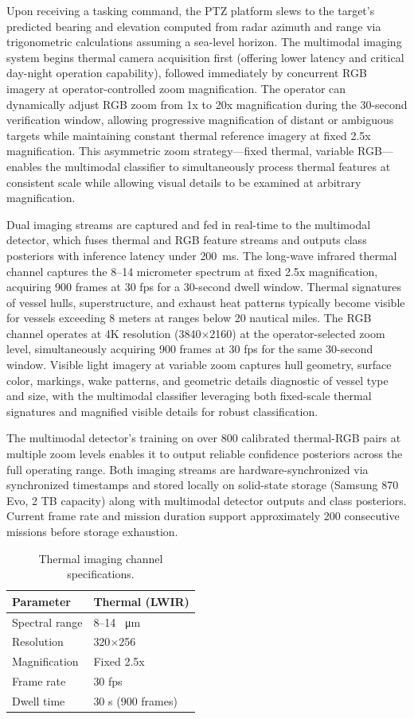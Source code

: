 \documentclass[conf]{asmeconf}
\begin{document}
Upon receiving a tasking command, the PTZ platform slews to the target's predicted bearing and elevation computed from radar azimuth and range via trigonometric calculations assuming a sea-level horizon. The multimodal imaging system begins thermal camera acquisition first (offering lower latency and critical day-night operation capability), followed immediately by concurrent RGB imagery at operator-controlled zoom magnification. The operator can dynamically adjust RGB zoom from 1x to 20x magnification during the 30-second verification window, allowing progressive magnification of distant or ambiguous targets while maintaining constant thermal reference imagery at fixed 2.5x magnification. This asymmetric zoom strategy—fixed thermal, variable RGB—enables the multimodal classifier to simultaneously process thermal features at consistent scale while allowing visual details to be examined at arbitrary magnification.

Dual imaging streams are captured and fed in real-time to the multimodal detector, which fuses thermal and RGB feature streams and outputs class posteriors with inference latency under \SI{200}{ms}. The long-wave infrared thermal channel captures the 8--14 micrometer spectrum at fixed 2.5x magnification, acquiring 900 frames at 30 fps for a 30-second dwell window. Thermal signatures of vessel hulls, superstructure, and exhaust heat patterns typically become visible for vessels exceeding 8 meters at ranges below 20 nautical miles. The RGB channel operates at 4K resolution (3840$\times$2160) at the operator-selected zoom level, simultaneously acquiring 900 frames at 30 fps for the same 30-second window. Visible light imagery at variable zoom captures hull geometry, surface color, markings, wake patterns, and geometric details diagnostic of vessel type and size, with the multimodal classifier leveraging both fixed-scale thermal signatures and magnified visible details for robust classification.

The multimodal detector's training on over 800 calibrated thermal-RGB pairs at multiple zoom levels enables it to output reliable confidence posteriors across the full operating range. Both imaging streams are hardware-synchronized via synchronized timestamps and stored locally on solid-state storage (Samsung 870 Evo, 2 TB capacity) along with multimodal detector outputs and class posteriors. Current frame rate and mission duration support approximately 200 consecutive missions before storage exhaustion.

\begin{table}[t]
\caption{Thermal imaging channel specifications.}
\label{tab:camera_thermal}
\centering
\small
\begin{tabular}{@{}ll@{}}
\toprule
Parameter & Thermal (LWIR) \\
\midrule
Spectral range & 8--14 \SI{}{\micro m} \\
Resolution & 320$\times$256 \\
Magnification & Fixed 2.5x \\
Frame rate & 30 fps \\
Dwell time & 30 s (900 frames) \\
\bottomrule
\end{tabular}
\end{table}
\end{document}
